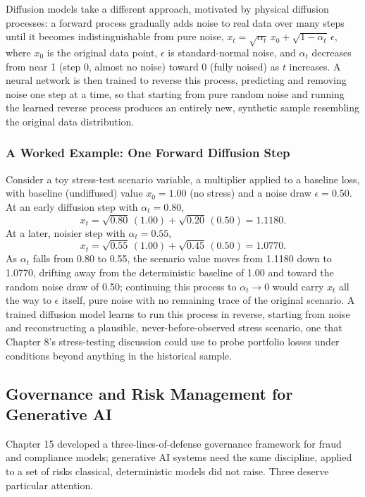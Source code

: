 \documentclass[../ai_in_finance]{subfiles}
\begin{document}
Diffusion models take a different approach, motivated by physical diffusion processes: a forward process gradually adds noise to real data over many steps until it becomes indistinguishable from pure noise, $x_t = \sqrt{\alpha_t}\, x_0 + \sqrt{1-\alpha_t}\,\epsilon$, where $x_0$ is the original data point, $\epsilon$ is standard-normal noise, and $\alpha_t$ decreases from near 1 (step 0, almost no noise) toward 0 (fully noised) as $t$ increases. A neural network is then trained to reverse this process, predicting and removing noise one step at a time, so that starting from pure random noise and running the learned reverse process produces an entirely new, synthetic sample resembling the original data distribution.

\subsubsection*{A Worked Example: One Forward Diffusion Step}

Consider a toy stress-test scenario variable, a multiplier applied to a baseline loss, with baseline (undiffused) value $x_0 = 1.00$ (no stress) and a noise draw $\epsilon = 0.50$. At an early diffusion step with
$\alpha_t = 0.80$,
$$x_t = \sqrt{0.80}\,(1.00) + \sqrt{0.20}\,(0.50) = 1.1180.$$
At a later, noisier step with $\alpha_t = 0.55$,
$$x_t = \sqrt{0.55}\,(1.00) + \sqrt{0.45}\,(0.50) = 1.0770.$$
As $\alpha_t$ falls from 0.80 to 0.55, the scenario value moves from 1.1180 down to 1.0770,
drifting away from the deterministic baseline of 1.00 and toward the random noise draw of 0.50; continuing this process to $\alpha_t \to 0$
would carry $x_t$ all the way to $\epsilon$ itself, pure noise with no remaining trace of the original scenario. A trained diffusion model learns
to run this process in reverse, starting from noise and reconstructing a plausible, never-before-observed stress scenario, one that
Chapter 8's stress-testing discussion could use to probe portfolio losses under conditions beyond anything in the historical sample.

\subsection{Governance and Risk Management for Generative AI}
\label{sec:genai-governance}

Chapter 15 developed a three-lines-of-defense governance framework for fraud and compliance models; generative AI systems need the same discipline, applied to a set of risks classical, deterministic models did not raise. Three deserve particular attention.
\end{document}
